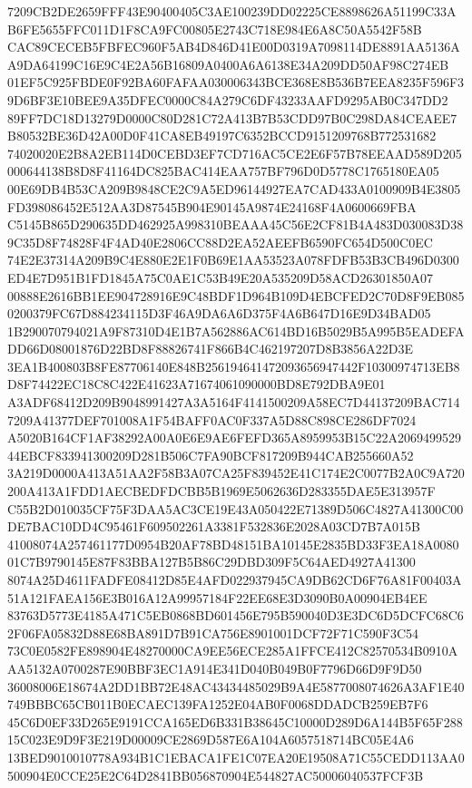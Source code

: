 \documentclass[UTF8,fontset=fandol,zihao=-4,a4paper]{ctexart}
\begin{document}
{{7209CB2DE2659FFF43E90400405C3AE100239DD02225CE8898626A51199C33AB6FE5655FFC011D1F8CA9FC00805E2743C718E984E6A8C50A5542F58B
CAC89CECEB5FBFEC960F5AB4D846D41E00D0319A7098114DE8891AA5136AA9DA64199C16E9C4E2A56B16809A0400A6A6138E34A209DD50AF98C274EB
01EF5C925FBDE0F92BA60FAFAA030006343BCE368E8B536B7EEA8235F596F39D6BF3E10BEE9A35DFEC0000C84A279C6DF43233AAFD9295AB0C347DD2
89FF7DC18D13279D0000C80D281C72A413B7B53CDD97B0C298DA84CEAEE7B80532BE36D42A00D0F41CA8EB49197C6352BCCD9151209768B772531682
74020020E2B8A2EB114D0CEBD3EF7CD716AC5CE2E6F57B78EEAAD589D205000644138B8D8F41164DC825BAC414EAA757BF796D0D5778C1765180EA05
00E69DB4B53CA209B9848CE2C9A5ED96144927EA7CAD433A0100909B4E3805FD398086452E512AA3D87545B904E90145A9874E24168F4A0600669FBA
C5145B865D290635DD462925A998310BEAAA45C56E2CF81B4A483D030083D389C35D8F74828F4F4AD40E2806CC88D2EA52AEEFB6590FC654D500C0EC
74E2E37314A209B9C4E880E2E1F0B69E1AA53523A078FDFB53B3CB496D0300ED4E7D951B1FD1845A75C0AE1C53B49E20A535209D58ACD26301850A07
00888E2616BB1EE904728916E9C48BDF1D964B109D4EBCFED2C70D8F9EB0850200379FC67D884234115D3F46A9DA6A6D375F4A6B647D16E9D34BAD05
1B290070794021A9F87310D4E1B7A562886AC614BD16B5029B5A995B5EADEFADD66D08001876D22BD8F88826741F866B4C462197207D8B3856A22D3E
3EA1B400803B8FE87706140E848B256194641472093656947442F10300974713EB8D8F74422EC18C8C422E41623A71674061090000BD8E792DBA9E01
A3ADF68412D209B9048991427A3A5164F4141500209A58EC7D44137209BAC7147209A41377DEF701008A1F54BAFF0AC0F337A5D88C898CE286DF7024
A5020B164CF1AF38292A00A0E6E9AE6FEFD365A8959953B15C22A206949952944EBCF833941300209D281B506C7FA90BCF817209B944CAB255660A52
3A219D0000A413A51AA2F58B3A07CA25F839452E41C174E2C0077B2A0C9A720200A413A1FDD1AECBEDFDCBB5B1969E5062636D283355DAE5E313957F
C55B2D010035CF75F3DAA5AC3CE19E43A050422E71389D506C4827A41300C00DE7BAC10DD4C95461F609502261A3381F532836E2028A03CD7B7A015B
41008074A257461177D0954B20AF78BD48151BA10145E2835BD33F3EA18A008001C7B9790145E87F83BBA127B5B86C29DBD309F5C64AED4927A41300
8074A25D4611FADFE08412D85E4AFD022937945CA9DB62CD6F76A81F00403A51A121FAEA156E3B016A12A99957184F22EE68E3D3090B0A00904EB4EE
83763D5773E4185A471C5EB0868BD601456E795B590040D3E3DC6D5DCFC68C62F06FA05832D88E68BA891D7B91CA756E8901001DCF72F71C590F3C54
73C0E0582FE898904E48270000CA9EE56ECE285A1FFCE412C82570534B0910AAA5132A0700287E90BBF3EC1A914E341D040B049B0F7796D66D9F9D50
36008006E18674A2DD1BB72E48AC43434485029B9A4E5877008074626A3AF1E40749BBBC65CB011B0ECAEC139FA1252E04AB0F0068DDADCB259EB7F6
45C6D0EF33D265E9191CCA165ED6B331B38645C10000D289D6A144B5F65F28815C023E9D9F3E219D00009CE2869D587E6A104A6057518714BC05E4A6
13BED9010010778A934B1C1EBACA1FE1C07EA20E19508A71C55CEDD113AA0500904E0CCE25E2C64D2841BB056870904E544827AC50006040537FCF3B
}}
\end{document}

